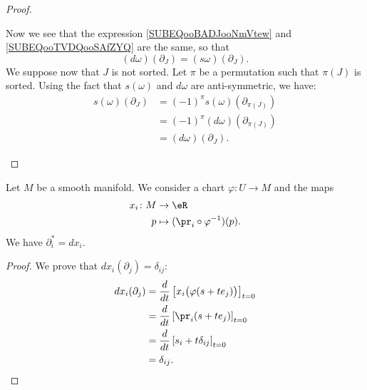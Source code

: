 \begin{proof}
\begin{subproof}
		Now we see that the expression \eqref{SUBEQooBADJooNmVtew} and \eqref{SUBEQooTVDQooSAfZYQ} are the same, so that
		\begin{equation}
			(d\omega)(\partial_J)=(s\omega)(\partial_J).
		\end{equation}
		We suppose now that \( J\) is not sorted. Let \( \pi\) be a permutation such that \( \pi(J)\) is sorted. Using the fact that \( s(\omega) \) and \( d\omega\) are anti-symmetric, we have:
		\begin{subequations}
			\begin{align}
				s(\omega)(\partial_J) & =(-1)^{\pi}s(\omega)(\partial_{\pi(J)}) \\
				                      & =(-1)^{\pi}(d\omega)(\partial_{\pi(J)}) \\
				                      & =(d\omega)(\partial_J).
			\end{align}
		\end{subequations}
	\end{subproof}
\end{proof}


\begin{lemma}		\label{LEMooJCXRooMQxauV}
	Let \( M\) be a smooth manifold. We consider a chart \(\varphi \colon U\to M  \) and the maps
	\begin{equation}
		\begin{aligned}
			x_i\colon M & \to \eR                              \\
			p           & \mapsto (\pr_i\circ\varphi^{-1})(p).
		\end{aligned}
	\end{equation}
	We have \( \partial_i^*=dx_i\).
\end{lemma}

\begin{proof}
	We prove that \( dx_i(\partial_j)=\delta_{ij}\):
	\begin{subequations}
		\begin{align}
			dx_i(\partial_j) & =\frac{d}{dt} \left[ x_i\big( \varphi(s+te_j) \big)  \right]_{t=0} \\
			                 & =\frac{d}{dt} \left[ \pr_i(s+te_j)  \right]_{t=0}                  \\
			                 & = \frac{d}{dt} \left[ s_i+t\delta_{ij}  \right]_{t=0}              \\
			                 & =\delta_{ij}.
		\end{align}
	\end{subequations}
\end{proof}

